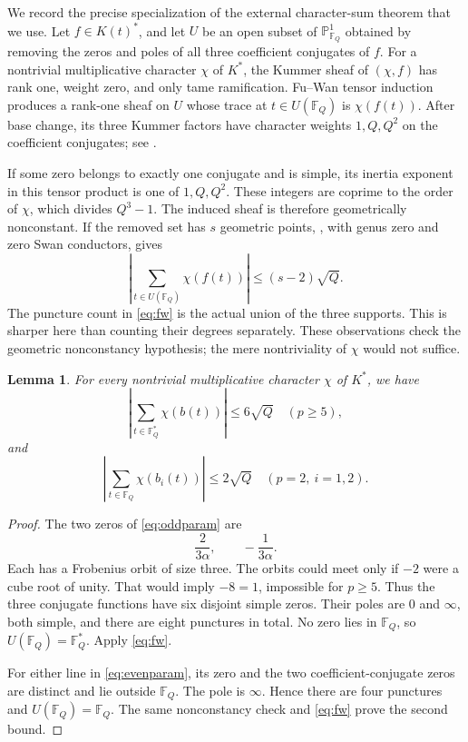 \documentclass[11pt]{article}
\newtheorem{lemma}[theorem]{Lemma}
\theoremstyle{remark}\newtheorem{remark}[theorem]{Remark}
\newcommand{\F}{\mathbb F}
\begin{document}
We record the precise specialization of the external character-sum theorem that we use. Let $f\in K(t)^*$, and let $U$ be an open subset of $\mathbb P^1_{\F_Q}$ obtained by removing the zeros and poles of all three coefficient conjugates of $f$. For a nontrivial multiplicative character $\chi$ of $K^*$, the Kummer sheaf of $(\chi,f)$ has rank one, weight zero, and only tame ramification. Fu--Wan tensor induction produces a rank-one sheaf on $U$ whose trace at $t\in U(\F_Q)$ is $\chi(f(t))$. After base change, its three Kummer factors have character weights $1,Q,Q^2$ on the coefficient conjugates; see \cite[Proposition 2.1]{FW}.

If some zero belongs to exactly one conjugate and is simple, its inertia exponent in this tensor product is one of $1,Q,Q^2$. These integers are coprime to the order of $\chi$, which divides $Q^3-1$. The induced sheaf is therefore geometrically nonconstant. If the removed set has $s$ geometric points, \cite[Theorem 4.2]{FW}, with genus zero and zero Swan conductors, gives
\begin{equation}\label{eq:fw}
 \left|\sum_{t\in U(\F_Q)}\chi(f(t))\right|\le(s-2)\sqrt Q.
\end{equation}
The puncture count in \eqref{eq:fw} is the actual union of the three supports. This is sharper here than counting their degrees separately. These observations check the geometric nonconstancy hypothesis; the mere nontriviality of $\chi$ would not suffice.

\begin{lemma}\label{lem:chars}
For every nontrivial multiplicative character $\chi$ of $K^*$, we have
\[
 \left|\sum_{t\in\F_Q^*}\chi(b(t))\right|\le6\sqrt Q\quad(p\ge5),
\]
and
\[
 \left|\sum_{t\in\F_Q}\chi(b_i(t))\right|\le2\sqrt Q
 \quad(p=2,\ i=1,2).
\]
\end{lemma}
\begin{proof}
The two zeros of \eqref{eq:oddparam} are
\[
 \frac{2}{3\alpha},\qquad -\frac{1}{3\alpha}.
\]
Each has a Frobenius orbit of size three. The orbits could meet only if $-2$ were a cube root of unity. That would imply $-8=1$, impossible for $p\ge5$. Thus the three conjugate functions have six disjoint simple zeros. Their poles are $0$ and $\infty$, both simple, and there are eight punctures in total. No zero lies in $\F_Q$, so $U(\F_Q)=\F_Q^*$. Apply \eqref{eq:fw}.

For either line in \eqref{eq:evenparam}, its zero and the two coefficient-conjugate zeros are distinct and lie outside $\F_Q$. The pole is $\infty$. Hence there are four punctures and $U(\F_Q)=\F_Q$. The same nonconstancy check and \eqref{eq:fw} prove the second bound.
\end{proof}
\end{document}
